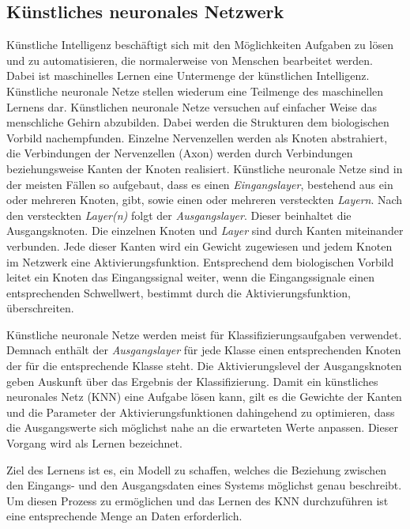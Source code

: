 \documentclass[11pt]{article}
\begin{document}
\subsection{Künstliches neuronales Netzwerk}

Künstliche Intelligenz beschäftigt sich mit den Möglichkeiten Aufgaben zu lösen und zu automatisieren, die normalerweise von Menschen bearbeitet werden. Dabei ist maschinelles Lernen eine Untermenge der künstlichen Intelligenz. Künstliche neuronale Netze stellen wiederum eine Teilmenge des maschinellen Lernens dar. Künstlichen neuronale Netze versuchen auf einfacher Weise das menschliche Gehirn abzubilden. Dabei werden die Strukturen dem biologischen Vorbild nachempfunden. Einzelne Nervenzellen werden als Knoten abstrahiert, die Verbindungen der Nervenzellen (Axon) werden durch Verbindungen beziehungsweise Kanten der Knoten realisiert. Künstliche neuronale Netze sind in der meisten Fällen so aufgebaut, dass es einen \textit{Eingangslayer}, bestehend aus ein oder mehreren Knoten, gibt, sowie einen oder mehreren versteckten \textit{Layern}. Nach den versteckten \textit{Layer(n)} folgt der \textit{Ausgangslayer}. Dieser beinhaltet die Ausgangsknoten. Die einzelnen Knoten und \textit{Layer} sind durch Kanten miteinander verbunden. Jede dieser Kanten wird ein Gewicht zugewiesen und jedem Knoten im Netzwerk eine Aktivierungsfunktion. Entsprechend dem biologischen Vorbild leitet ein Knoten das Eingangssignal weiter, wenn die Eingangssignale einen entsprechenden Schwellwert, bestimmt durch die Aktivierungsfunktion, überschreiten.

Künstliche neuronale Netze werden meist für Klassifizierungsaufgaben verwendet. Demnach enthält der \textit{Ausgangslayer} für jede Klasse einen entsprechenden Knoten der für die entsprechende Klasse steht. Die Aktivierungslevel der Ausgangsknoten geben Auskunft über das Ergebnis der Klassifizierung.  Damit ein künstliches neuronales Netz (KNN) eine Aufgabe lösen kann, gilt es die Gewichte der Kanten und die Parameter der Aktivierungsfunktionen dahingehend zu optimieren, dass die Ausgangswerte sich möglichst nahe an die erwarteten Werte anpassen. Dieser Vorgang wird als Lernen bezeichnet.

Ziel des Lernens ist es, ein Modell zu schaffen, welches die Beziehung zwischen den Eingangs- und den Ausgangsdaten eines Systems möglichst genau beschreibt. Um diesen Prozess zu ermöglichen und das Lernen des KNN durchzuführen ist eine entsprechende Menge an Daten erforderlich.\parencite{M.AnderssonM.Arvola}\parencite{Chollet2017}
\end{document}
